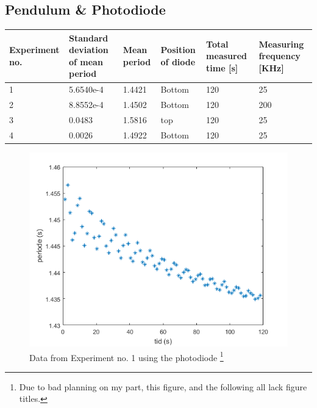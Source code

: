 \documentclass[%
 reprint,
 amsmath,amssymb,
 aps,
]{revtex4-1}
\begin{document}
    \subsection{Pendulum \& Photodiode}

    	\begin{center} %
	    \begin{tabular}{| p{1.7cm} | p{1.5cm} | p{1.5cm} | p{1.5cm} | p{1.5cm} | p{1.5cm} |}
		    \hline
		    Experiment no. & Standard deviation of mean period & Mean period & Position of diode & Total measured time [s] & Measuring frequency [KHz] \\ \hline
		    1 & 5.6540e-4 & 1.4421 & Bottom & 120 & 25 \\ \hline
		    2 & 8.8552e-4 & 1.4502 & Bottom & 120 & 200 \\ \hline
		    3 & 0.0483 & 1.5816 & top & 120 & 25 \\ \hline
		    4 & 0.0026 & 1.4922 & Bottom & 120 & 25 \\ \hline
	    \end{tabular}
    \end{center}
    
    \begin{figure}[h!]
    	\center
    	\includegraphics[scale=0.6]{forsok1fig1}
    	\caption{Data from Experiment no. 1 using the photodiode
    	\footnote{Due to bad planning on my part, this figure, and the following all lack figure titles.
    	}}
    \end{figure}
\end{document}
